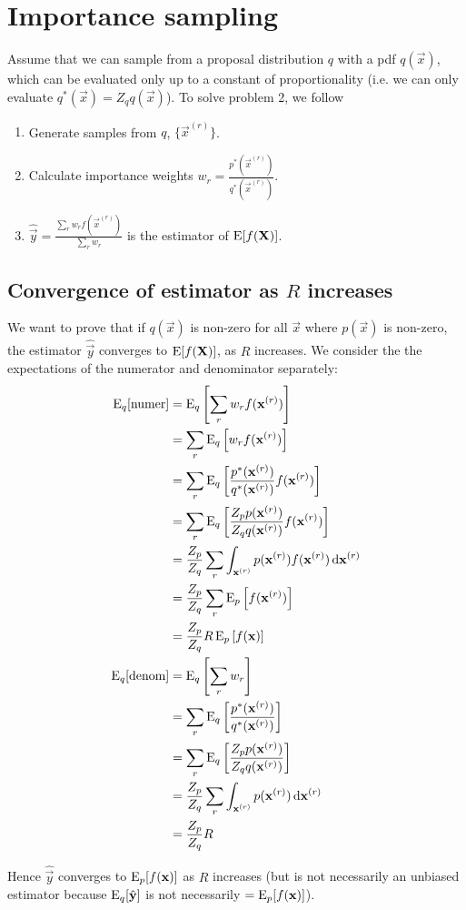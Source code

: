 \section{Importance sampling}

Assume that we can sample from a proposal distribution $q$ with a pdf $q(\vec x)$, which can be evaluated only up to a constant of proportionality (i.e. we can only evaluate $q^\ast(\vec x) = Z_q q(\vec x)$). To solve problem 2, we follow
\begin{enumerate}
    \item Generate samples from $q$, $\{\vec x^{(r)}\}$.
    \item Calculate importance weights $w_r = \frac{p^\ast(\vec x^{(r)})}{q^\ast(\vec x^{(r)})}$.
    \item $\hat{\vec y} = \frac{\sum_r w_r f(\vec x^{(r)})}{\sum_r w_r}$ is the estimator of $\operatorname{\mathrm{E}}[f(\boldsymbol{\mathbf{X}})]$.
\end{enumerate}

\subsection{Convergence of estimator as $R$ increases}
    We want to prove that if $q(\vec x)$ is non-zero for all $\vec x$ where $p(\vec x)$ is non-zero, the estimator $\hat{\vec y}$ converges to $\operatorname{\mathrm{E}}[f(\boldsymbol{\mathbf{X}})]$, as $R$ increases. We consider the the expectations of the numerator and denominator separately:
    \begin{align}
        \operatorname{\mathrm{E}}_q[\text{numer}]  &= \operatorname{\mathrm{E}}_q\left[\sum_r w_r f(\boldsymbol{\mathbf{x}}^{(r)})\right] \\
                            &= \sum_r \operatorname{\mathrm{E}}_q\left[w_r f(\boldsymbol{\mathbf{x}}^{(r)})\right] \\
                            &= \sum_r \operatorname{\mathrm{E}}_q\left[\frac{p^\ast(\boldsymbol{\mathbf{x}}^{(r)})}{q^\ast(\boldsymbol{\mathbf{x}}^{(r)})} f(\boldsymbol{\mathbf{x}}^{(r)})\right] \\
                            &= \sum_r \operatorname{\mathrm{E}}_q\left[\frac{Z_p p(\boldsymbol{\mathbf{x}}^{(r)})}{Z_q q(\boldsymbol{\mathbf{x}}^{(r)})} f(\boldsymbol{\mathbf{x}}^{(r)})\right] \\
                            &= \frac{Z_p}{Z_q} \sum_r \int_{\boldsymbol{\mathbf{x}}^{(r)}} p(\boldsymbol{\mathbf{x}}^{(r)}) f(\boldsymbol{\mathbf{x}}^{(r)}) \, \mathrm d \boldsymbol{\mathbf{x}}^{(r)} \\
                            &= \frac{Z_p}{Z_q} \sum_r \operatorname{\mathrm{E}}_p\left[f(\boldsymbol{\mathbf{x}}^{(r)})\right] \\
                            &= \frac{Z_p}{Z_q} R \operatorname{\mathrm{E}}_p\left[f(\boldsymbol{\mathbf{x}})\right] \\
        \operatorname{\mathrm{E}}_q[\text{denom}]  &= \operatorname{\mathrm{E}}_q\left[\sum_r w_r\right] \\
                            &= \sum_r \operatorname{\mathrm{E}}_q\left[\frac{p^\ast(\boldsymbol{\mathbf{x}}^{(r)})}{q^\ast(\boldsymbol{\mathbf{x}}^{(r)})}\right] \\
                            &= \sum_r \operatorname{\mathrm{E}}_q\left[\frac{Z_p p(\boldsymbol{\mathbf{x}}^{(r)})}{Z_q q(\boldsymbol{\mathbf{x}}^{(r)})}\right] \\
                            &= \frac{Z_p}{Z_q} \sum_r \int_{\boldsymbol{\mathbf{x}}^{(r)}} p(\boldsymbol{\mathbf{x}}^{(r)}) \,\mathrm d \boldsymbol{\mathbf{x}}^{(r)} \\
                            &= \frac{Z_p}{Z_q} R
    \end{align}

    Hence $\hat{\vec y}$ converges to $\operatorname{\mathrm{E}}_p[f(\boldsymbol{\mathbf{x}})]$ as $R$ increases (but is not necessarily an unbiased estimator because $\operatorname{\mathrm{E}}_q[\hat{\boldsymbol{\mathbf{y}}}]$ is not necessarily $= \operatorname{\mathrm{E}}_p[f(\boldsymbol{\mathbf{x}})]$).